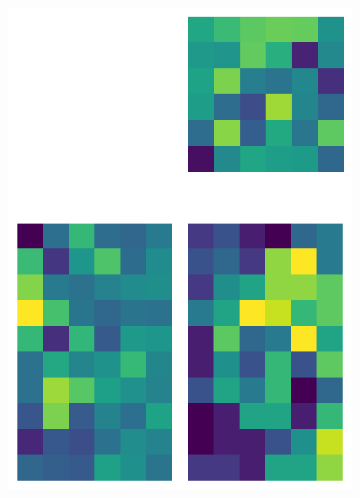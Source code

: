 \documentclass[10pt,twocolumn]{article}
\begin{document}
\begin{figure}[H]
\begin{subfigure}[t]{.15\textwidth}
\includegraphics[scale=.2]{DWGs/semi-structured-matrix-reconstruction-PCs-6.png}
\caption{ }
\end{subfigure}
\begin{subfigure}[t]{.15\textwidth}
\centering

\end{subfigure}
\end{figure}
\end{document}
